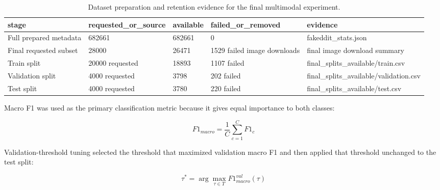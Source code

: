 \begin{table}[H]
\centering
\tiny
\caption{Dataset preparation and retention evidence for the final multimodal experiment.}
\label{tab:dataset_retention}
\begin{tabularx}{\textwidth}{YYYYY}
\toprule
stage & requested\_\allowbreak or\_\allowbreak source & available & failed\_\allowbreak or\_\allowbreak removed & evidence \\
\midrule
Full prepared metadata & 682661 & 682661 & 0 & fakeddit\_\allowbreak stats.json \\
Final requested subset & 28000 & 26471 & 1529 failed image downloads & final image download summary \\
Train split & 20000 requested & 18893 & 1107 failed & final\_\allowbreak splits\_\allowbreak available/\allowbreak train.csv \\
Validation split & 4000 requested & 3798 & 202 failed & final\_\allowbreak splits\_\allowbreak available/\allowbreak validation.csv \\
Test split & 4000 requested & 3780 & 220 failed & final\_\allowbreak splits\_\allowbreak available/\allowbreak test.csv \\
\bottomrule
\end{tabularx}
\end{table}

Macro F1 was used as the primary classification metric because it gives equal importance to both classes:

\begin{equation}
F1_{macro}=\frac{1}{C}\sum_{c=1}^{C}F1_c
\label{eq:macro_f1}
\end{equation}

Validation-threshold tuning selected the threshold that maximized validation macro F1 and then applied that threshold unchanged to the test split:

\begin{equation}
\tau^* = \arg\max_{\tau \in T} F1_{macro}^{val}(\tau)
\label{eq:threshold_tuning}
\end{equation}

